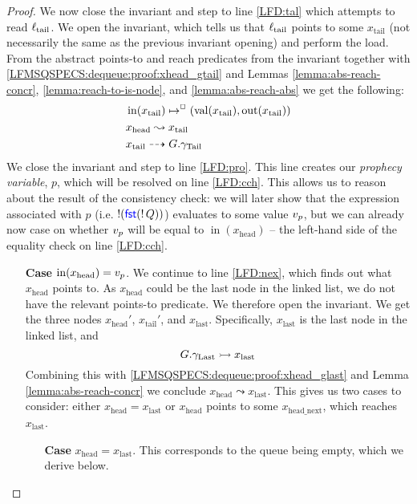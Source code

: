 \documentclass[a4paper, 10pt]{report}
\theoremstyle{definition}
\newcommand{\locN}[1]{\loc_{\mathrm{#1}}}
\newcommand{\loctail}{\locN{tail}}
\newcommand{\nIn}[1]{\operatorname{in}(#1)}
\newcommand{\nVal}[1]{\operatorname{val}(#1)}
\newcommand{\nOut}[1]{\operatorname{out}(#1)}
\newcommand{\node}{x}
\newcommand{\nodeN}[1]{\node_{\mathrm{#1}}}
\newcommand{\nodehead}{\nodeN{head}}
\newcommand{\nodetail}{\nodeN{tail}}
\newcommand{\nodelast}{\nodeN{last}}
\newcommand{\nodeheadnext}{\nodeN{head\_next}}
\newcommand{\prophval}{\val_p}
\newcommand{\Qg}{G}
\newcommand{\gtail}{\gname_{\mathrm{Tail}}}
\newcommand{\glast}{\gname_{\mathrm{Last}}}
\newcommand{\isNode}[1]{\nIn{#1} \mapsto^{\persistently} (\nVal{#1}, \nOut{#1})}
\newcommand{\reach}[2]{#1 \leadsto #2}
\newcommand{\ar}[2]{#1 \dashrightarrow #2}
\newcommand{\ap}[2]{#1 \rightarrowtail #2}
\begin{document}
\begin{proof}
  We now close the invariant and step to line \ref{LFD:tal} which attempts to read $\loctail$. We open the invariant, which tells us that $\loctail$ points to some $\nodetail$ (not necessarily the same as the previous invariant opening) and perform the load. From the abstract points-to and reach predicates from the invariant together with \ref{LFMSQSPECS:dequeue:proof:xhead_gtail} and Lemmas \ref{lemma:abs-reach-concr}, \ref{lemma:reach-to-is-node}, and \ref{lemma:abs-reach-abs} we get the following:
  \begin{align}
    &\isNode{\nodetail}\label{LFMSQSPECS:dequeue:proof:xtail_node}\\
    &\reach{\nodehead}{\nodetail}\label{LFMSQSPECS:dequeue:proof:xhead_r_xtail}\\
    &\ar{\nodetail}{\Qg.\gtail}\label{LFMSQSPECS:dequeue:proof:xtail_gtail}\\
  \end{align}
  We close the invariant and step to line \ref{LFD:pro}. This line creates our \textit{prophecy variable}, $p$, which will be resolved on line \ref{LFD:cch}. This allows us to reason about the result of the consistency check: we will later show that the expression associated with $p$ (i.e. $\mathop{!}(\operatorname{\textsf{\color{blue} fst}} (\mathop{!} Q))$) evaluates to some value $\prophval$, but we can already now case on whether $\prophval$ will be equal to $\nIn{\nodehead}$ -- the left-hand side of the equality check on line \ref{LFD:cch}.
  \begin{itemize}
    \item[\textbf{Case}] $\nIn{\nodehead} = \prophval$.
    We continue to line \ref{LFD:nex}, which finds out what $\nodehead$ points to. As $\nodehead$ could be the last node in the linked list, we do not have the relevant points-to predicate. We therefore open the invariant. We get the three nodes $\nodehead'$, $\nodetail'$, and $\nodelast$. Specifically, $\nodelast$ is the last node in the linked list, and
    \begin{equation}\label{LFMSQSPECS:dequeue:proof:glast_xlast}
      \ap{\Qg.\glast}{\nodelast}
    \end{equation}
    Combining this with \ref{LFMSQSPECS:dequeue:proof:xhead_glast} and Lemma \ref{lemma:abs-reach-concr} we conclude $\reach{\nodehead}{\nodelast}$. This gives us two cases to consider: either $\nodehead = \nodelast$ or $\nodehead$ points to some $\nodeheadnext$, which reaches $\nodelast$.
    \begin{itemize}
      \item[\textbf{Case}] $\nodehead = \nodelast$. This corresponds to the queue being empty, which we derive below.\\

\end{itemize}
\end{itemize}
\end{proof}
\end{document}
